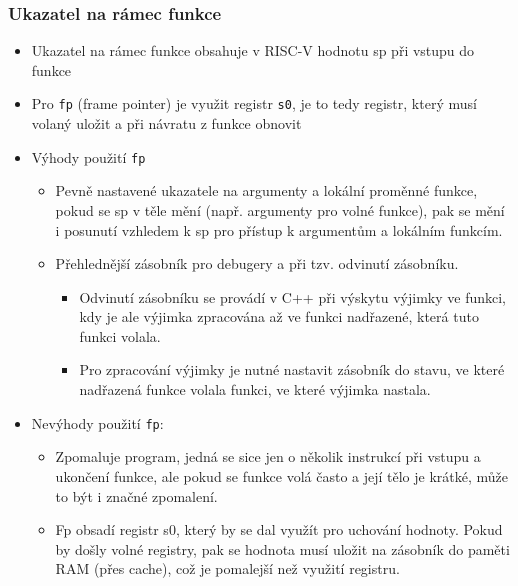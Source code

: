 \documentclass{beamer}
\begin{document}
\begin{frame}[shrink=5]
\frametitle{Ukazatel na rámec funkce}

\begin{itemize}
 \item Ukazatel na rámec funkce obsahuje v RISC-V hodnotu sp při vstupu do funkce
 \item Pro \texttt{fp} (frame pointer) je využit registr \texttt{s0}, je to tedy registr, který musí volaný uložit a při návratu z funkce obnovit
 \item Výhody použití \texttt{fp}
\begin{itemize}
 \item Pevně nastavené ukazatele na argumenty a lokální proměnné funkce, pokud se sp v těle mění (např. argumenty pro volné funkce), pak se mění i posunutí vzhledem k sp pro přístup k argumentům a lokálním funkcím.
 \item Přehlednější zásobník pro debugery a při tzv. odvinutí zásobníku.
\begin{itemize}
 \item Odvinutí zásobníku se provádí v C++ při výskytu výjimky ve funkci, kdy je ale výjimka zpracována až ve funkci nadřazené, která tuto funkci volala.
 \item Pro zpracování výjimky je nutné nastavit zásobník do stavu, ve které nadřazená funkce volala funkci, ve které výjimka nastala.
\end{itemize}
\end{itemize}
 \item Nevýhody použití \texttt{fp}:
\begin{itemize}
 \item Zpomaluje program, jedná se sice jen o několik instrukcí při vstupu a ukončení funkce, ale pokud se funkce volá často a její tělo je krátké, může to být i značné zpomalení.
 \item Fp obsadí registr s0, který by se dal využít pro uchování hodnoty. Pokud by došly volné registry, pak se hodnota musí uložit na zásobník do paměti RAM (přes cache), což je pomalejší než využití registru.
\end{itemize}
\end{itemize}
\end{frame}
\end{document}
